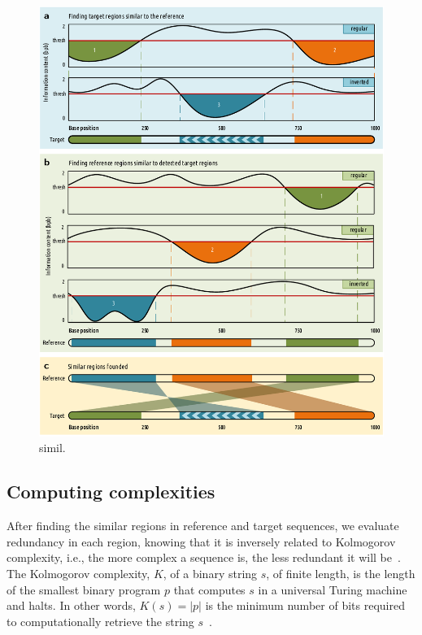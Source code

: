 \begin{figure}[!h]
  \centering
  \includegraphics[width=.95\linewidth]{simil.pdf}
  \caption{simil.}
  \label{fig.simil}
\end{figure}

\subsection{Computing complexities}
After finding the similar regions in reference and target sequences, we evaluate redundancy in each region, knowing that it is inversely related to Kolmogorov complexity, i.e., the more complex a sequence is, the less redundant it will be~\cite{hosseini2018cryfa}. The Kolmogorov complexity, $K$, of a binary string $s$, of finite length, is the length of the smallest binary program $p$ that computes $s$ in a universal Turing machine and halts. In other words, $K(s)=|p|$ is the minimum number of bits required to computationally retrieve the string $s$~\cite{turing1936on,li2009an}.

